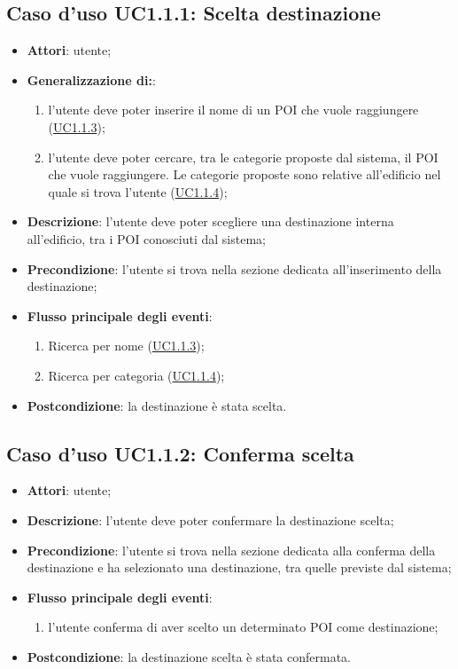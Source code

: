 \documentclass[../AnalisiDeiRequisiti.tex]{subfiles}
\begin{document}
\subsection{Caso d'uso UC1.1.1: Scelta destinazione}
\begin{itemize}
	\item \textbf{Attori}: utente;
	
	\item \textbf{Generalizzazione di:}:
	\begin{enumerate}
		\item l'utente deve poter inserire il nome di un POI che vuole raggiungere (\hyperlink{UC1.1.3}{UC1.1.3});
		\item l'utente deve poter cercare, tra le categorie proposte dal sistema, il POI che vuole raggiungere. Le categorie proposte sono relative all'edificio nel quale si trova l'utente (\hyperlink{UC1.1.4}{UC1.1.4});
		
	\end{enumerate}
	\item \textbf{Descrizione}: l'utente deve poter scegliere una destinazione interna all'edificio, tra i POI conosciuti dal sistema; 
	\item \textbf{Precondizione}: l'utente si trova nella sezione dedicata all'inserimento della destinazione;
	
	\item \textbf{Flusso principale degli eventi}:
	\begin{enumerate}
		\item Ricerca per nome (\hyperlink{UC1.1.3}{UC1.1.3});
		\item Ricerca per categoria (\hyperlink{UC1.1.4}{UC1.1.4});
		
	\end{enumerate}
	\item \textbf{Postcondizione}: la destinazione è stata scelta.
\end{itemize}
\hypertarget{UC1.1.2}{}
\subsection{Caso d'uso UC1.1.2: Conferma scelta}
\begin{itemize}
	\item \textbf{Attori}: utente;
	\item \textbf{Descrizione}: l'utente deve poter confermare la destinazione scelta; 
	\item \textbf{Precondizione}: l'utente si trova nella sezione dedicata alla conferma della destinazione e ha selezionato una destinazione, tra quelle previste dal sistema;
	
	\item \textbf{Flusso principale degli eventi}:
	\begin{enumerate}
		\item l'utente conferma di aver scelto un determinato POI come destinazione;
		
	\end{enumerate}
	\item \textbf{Postcondizione}: la destinazione scelta è stata confermata.
\end{itemize}
\hypertarget{UC1.1.3}{}
\end{document}
